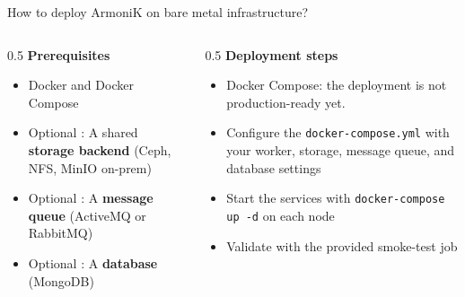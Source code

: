 \begin{frame}{How to deploy ArmoniK on bare metal infrastructure?}
	\begin{columns}[T]
		\begin{column}{0.5\textwidth}
			\textbf{Prerequisites}
			\begin{itemize}
				\item Docker and Docker Compose
				\item Optional : A shared \textbf{storage backend} (Ceph, NFS, MinIO on-prem)
				\item Optional : A \textbf{message queue} (ActiveMQ or RabbitMQ)
				\item Optional : A \textbf{database} (MongoDB)
			\end{itemize}
		\end{column}
		\begin{column}{0.5\textwidth}
			\textbf{Deployment steps}
			\begin{itemize}
				\item Docker Compose: the deployment is not production-ready yet.
				\item Configure the \texttt{docker-compose.yml} with your worker, storage, message queue, and database settings
				\item Start the services with \texttt{docker-compose up -d} on each node
				\item Validate with the provided smoke-test job
			\end{itemize}
		\end{column}
	\end{columns}
\end{frame}

